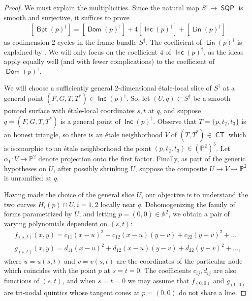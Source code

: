 \documentclass[reqno, 11pt]{amsart}
\theoremstyle{plain}
\theoremstyle{remark}
\renewcommand{\P}{\mathbb{P}}
\DeclareMathOperator{\CT}{\mathsf{CT}}
\DeclareMathOperator{\SQP}{\mathsf{SQP}}
\DeclareMathOperator{\BP}{\mathsf{Bpt}}
\DeclareMathOperator{\Dom}{\mathsf{Dom}}
\DeclareMathOperator{\Lin}{\mathsf{Lin}}
\DeclareMathOperator{\Inc}{\mathsf{Inc}}
\begin{document}
\begin{proof}
    We must explain the multiplicities. Since the natural map $S^{\dagger} \to \SQP$ is smooth and surjective, it suffices to prove 
    \begin{align}
    \label{daggermult}
    \left[\BP(p)^{\dagger} \right] = \left[\Dom(p)^{\dagger} \right] + 4\left[\Inc(p)^{\dagger}
    \right] + \left[\Lin(p)^{\dagger} \right]
    \end{align} as codimension 2 cycles in the frame bundle  $S^{\dagger}$.   The coefficient of $\Lin(p)^{\dagger}$ is explained by . We will only  focus on the coefficient $4$ of $\Inc(p)^{\dagger}$, as the ideas apply equally well (and with fewer complications) to the  coefficient of $\Dom(p)^{\dagger}$. 

    We will choose a sufficiently general $2$-dimensional \'etale-local slice of $S^\dagger$ at a general point $(F,G,T,T^{*}) \in \Inc(p)^{\dagger}$. So, let $(U,q) \subset S^{\dagger}$ be a smooth pointed surface with \'etale-local coordinates $s,t$ at $q$, and suppose $q = (F,G,T,T^{*})$ is a general point of $\Inc(p)^{\dagger}$. Observe that $T = \{p, t_{2}, t_{3}\}$ is an honest triangle, so there is an \'etale neighborhood $V$ of $(T,T^{*}) \in \CT$  which is isomorphic to an \'etale neighborhood the point $(p,t_{2},t_{3}) \in (\P^{2})^{3}$. Let $\alpha_{1}:V \to \P^{2}$ denote projection onto the first factor.  Finally, as part of the generic hypotheses on $U$, after possibly shrinking $U$, suppose the composite $U \to V \to \P^{2}$ is unramified at $q$.  
    
    Having made the choice of the general slice $U$, our objective is to understand the two curves $H_{i}(p) \cap U, i=1,2$ locally near $q$.  Dehomogenizing the family of forms parametrized by $U$, and letting $p = (0,0) \in \mathbb{A}^{2}$, we obtain a pair of varying polynomials dependent on $(s,t)$: 
    \begin{align*}
        f_{(s,t)}(x,y) = c_{11}(x-u)^{2} + c_{12}(x-u)(y-v) + c_{22}(y-v)^{2} + \dots \\
        g_{(s,t)}(x,y) = d_{11}(x-u)^{2} + d_{12}(x-u)(y-v) + d_{22}(y-v)^{2} + \dots,
    \end{align*}
    where $u = u(s,t)$ and $v = v(s,t)$ are the coordinates of the particular node which coincides with the point $p$ at $s=t=0$. The coefficients $c_{ij},d_{ij}$ are also functions of $(s,t)$, and when $s=t=0$ we may assume that $f_{(0,0)}$ and $g_{(0,0)}$ are tri-nodal quintics whose tangent cones at $p=(0,0)$ do not share a line. 


\end{proof}
\end{document}
